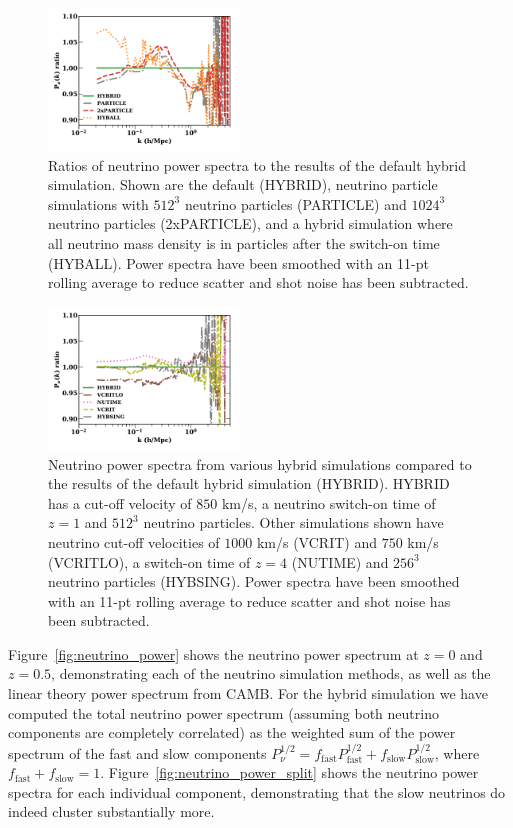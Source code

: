 \documentclass[useAMS, usenatbib]{mnras}
\begin{document}
\begin{figure}
  \includegraphics[width=0.45\textwidth]{nuplots/pks_nu_ckrel2-1.pdf}
    \caption{Ratios of neutrino power spectra to the results of the default hybrid simulation. Shown are the default (HYBRID), neutrino particle simulations with $512^3$ neutrino particles (PARTICLE) and $1024^3$ neutrino particles (2xPARTICLE), and a hybrid simulation where all neutrino mass density is in particles after the switch-on time (HYBALL). Power spectra have been smoothed with an 11-pt rolling average to reduce scatter and shot noise has been subtracted.}
  \label{fig:hybparticle}
\end{figure}

\begin{figure}
  \includegraphics[width=0.45\textwidth]{nuplots/pks_nu_ckrel-1.pdf}
  \caption{Neutrino power spectra from various hybrid simulations compared to the results of the default hybrid simulation (HYBRID). HYBRID has a cut-off velocity of $850$ km/s, a neutrino switch-on time of $z=1$ and $512^3$ neutrino particles. Other simulations shown have neutrino cut-off velocities of $1000$ km/s (VCRIT) and $750$ km/s (VCRITLO), a switch-on time of $z=4$ (NUTIME) and $256^3$ neutrino particles (HYBSING). Power spectra have been smoothed with an 11-pt rolling average to reduce scatter and shot noise has been subtracted.}
  \label{fig:vcrit}
\end{figure}

Figure~\ref{fig:neutrino_power} shows the neutrino power spectrum at $z=0$ and $z=0.5$, demonstrating each of the neutrino simulation methods, as well as the linear theory power spectrum from CAMB. For the hybrid simulation we have computed the total neutrino power spectrum (assuming both neutrino components are completely correlated) as the weighted sum of the power spectrum of the fast and slow components $P^{1/2}_\nu = f_\mathrm{fast} P^{1/2}_\mathrm{fast} + f_\mathrm{slow} P^{1/2}_\mathrm{slow}$, where $f_\mathrm{fast} + f_\mathrm{slow} = 1$. Figure~\ref{fig:neutrino_power_split} shows the neutrino power spectra for each individual component, demonstrating that the slow neutrinos do indeed cluster substantially more.
\end{document}
